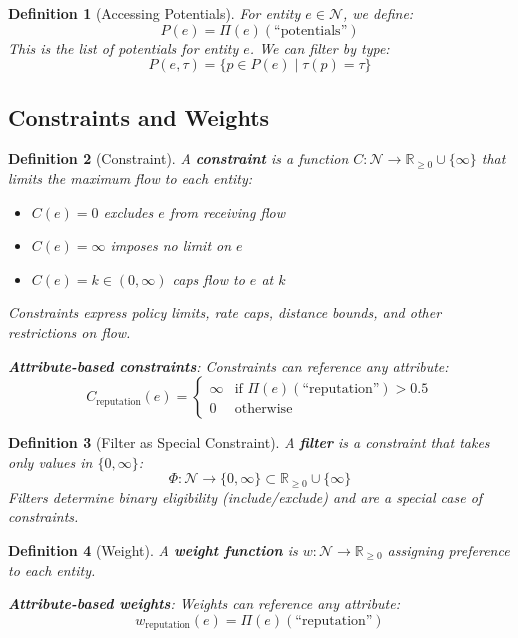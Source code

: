 \documentclass[11pt]{article}
\newtheorem{definition}{Definition}
\begin{document}
\begin{definition}[Accessing Potentials]
For entity $e \in \mathcal{N}$, we define:
\[
P(e) = \Pi(e)(\text{``potentials''})
\]
This is the list of potentials for entity $e$. We can filter by type:
\[
P(e, \tau) = \{ p \in P(e) \mid \tau(p) = \tau \}
\]
\end{definition}

\subsection{Constraints and Weights}

\begin{definition}[Constraint]
A \textbf{constraint} is a function $C: \mathcal{N} \to \mathbb{R}_{\geq 0} \cup \{\infty\}$ that limits the maximum flow to each entity:
\begin{itemize}
\item $C(e) = 0$ excludes $e$ from receiving flow
\item $C(e) = \infty$ imposes no limit on $e$
\item $C(e) = k \in (0, \infty)$ caps flow to $e$ at $k$
\end{itemize}
Constraints express policy limits, rate caps, distance bounds, and other restrictions on flow.

\textbf{Attribute-based constraints}: Constraints can reference any attribute:
\[
C_{\text{reputation}}(e) = \begin{cases} \infty & \text{if } \Pi(e)(\text{``reputation''}) > 0.5 \\ 0 & \text{otherwise} \end{cases}
\]
\end{definition}

\begin{definition}[Filter as Special Constraint]
A \textbf{filter} is a constraint that takes only values in $\{0, \infty\}$:
\[
\Phi: \mathcal{N} \to \{0, \infty\} \subset \mathbb{R}_{\geq 0} \cup \{\infty\}
\]
Filters determine binary eligibility (include/exclude) and are a special case of constraints.
\end{definition}

\begin{definition}[Weight]
A \textbf{weight function} is $w: \mathcal{N} \to \mathbb{R}_{\geq 0}$ assigning preference to each entity.

\textbf{Attribute-based weights}: Weights can reference any attribute:
\[
w_{\text{reputation}}(e) = \Pi(e)(\text{``reputation''})
\]
\end{definition}
\end{document}
